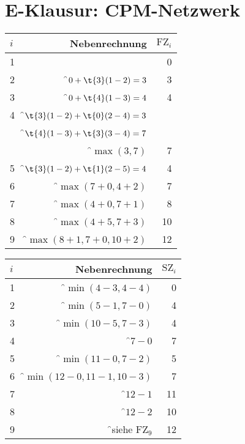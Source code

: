 \documentclass{lehramt-informatik-minimal}
\begin{document}
\section{E-Klausur: CPM-Netzwerk}


\begin{tabular}{|l|r|r|}
\hline
$i$ & Nebenrechnung & $\text{FZ}_i$\\
\hline\hline
1             &                                                & 0 \\\hline
2             & \f$0 + \t{3}(1-2) = 3$                         & 3 \\\hline
3             & \f$0 + \t{4}(1-3) = 4$                 & 4 \\\hline
4             & \f$\t{3}(1-2) + \t{0}(2-4) = 3$                & \\
              & \f$\t{4}(1-3) + \t{3}(3-4) = 7$                & \\
              & \f$\max(3,7)$                                  & 7 \\\hline
5             & \f$\t{3}(1-2) + \t{1}(2-5) = 4$                 & 4 \\\hline
6             & \f$\max(7 + 0, 4 + 2)$  & 7 \\\hline
7             & \f$\max(4 + 0, 7 + 1)$  & 8 \\\hline
8             & \f$\max(4 + 5, 7 + 3)$  & 10 \\\hline
9             & \f$\max(8 + 1, 7 + 0, 10 + 2)$  & 12 \\\hline
\end{tabular}

\begin{tabular}{|l|r|r|}
\hline
$i$ & Nebenrechnung & $\text{SZ}_i$\\
\hline\hline
1             & \f$\min(4 - 3, 4 - 4)$  & 0 \\
2             & \f$\min(5 - 1, 7 - 0)$ & 4 \\
3             & \f$\min(10 - 5, 7 - 3)$ & 4 \\
4             & \f$7 - 0$ & 7 \\
5             & \f$\min(11 - 0, 7 - 2)$ & 5 \\
6             & \f$\min(12 - 0, 11 - 1, 10 - 3)$ & 7 \\
7             & \f$12 - 1$ & 11 \\
8             & \f$12 - 2$ & 10 \\
9             & \f{}siehe $\text{FZ}_9$  & 12 \\\hline
\end{tabular}
\end{document}
